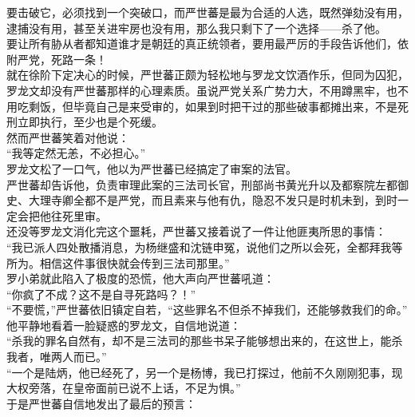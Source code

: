 \begin{multicols}{\theparacolNo}
要击破它，必须找到一个突破口，而严世蕃是最为合适的人选，既然弹劾没有用，逮捕没有用，甚至关进牢房也没有用，那么我只剩下了一个选择——杀了他。\\

要让所有胁从者都知道谁才是朝廷的真正统领者，要用最严厉的手段告诉他们，依附严党，死路一条！\\

就在徐阶下定决心的时候，严世蕃正颇为轻松地与罗龙文饮酒作乐，但同为囚犯，罗龙文却没有严世蕃那样的心理素质。虽说严党关系广势力大，不用蹲黑牢，也不用吃剩饭，但毕竟自己是来受审的，如果到时把干过的那些破事都摊出来，不是死刑立即执行，至少也是个死缓。\\

然而严世蕃笑着对他说：\\

“我等定然无恙，不必担心。”\\

罗龙文松了一口气，他以为严世蕃已经搞定了审案的法官。\\

严世蕃却告诉他，负责审理此案的三法司长官，刑部尚书黄光升以及都察院左都御史、大理寺卿全都不是严党，而且素来与他有仇，隐忍不发只是时机未到，到时一定会把他往死里审。\\

还没等罗龙文消化完这个噩耗，严世蕃又接着说了一件让他匪夷所思的事情：\\

“我已派人四处散播消息，为杨继盛和沈链申冤，说他们之所以会死，全都拜我等所为。相信这件事很快就会传到三法司那里。”\\

罗小弟就此陷入了极度的恐慌，他大声向严世蕃吼道：\\

“你疯了不成？这不是自寻死路吗？！”\\

“不要慌，”严世蕃依旧镇定自若，“这些罪名不但杀不掉我们，还能够救我们的命。”\\

他平静地看着一脸疑惑的罗龙文，自信地说道：\\

“杀我的罪名自然有，却不是三法司的那些书呆子能够想出来的，在这世上，能杀我者，唯两人而已。”\\

“一个是陆炳，他已经死了，另一个是杨博，我已打探过，他前不久刚刚犯事，现大权旁落，在皇帝面前已说不上话，不足为惧。”\\

于是严世蕃自信地发出了最后的预言：\\


\end{multicols}
